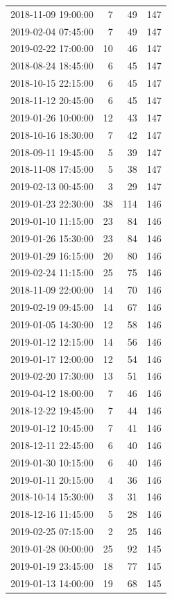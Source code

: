 \begin{tabular}{lrrr}
2018-11-09 19:00:00 & 7 & 49 & 147 \\
2019-02-04 07:45:00 & 7 & 49 & 147 \\
2019-02-22 17:00:00 & 10 & 46 & 147 \\
2018-08-24 18:45:00 & 6 & 45 & 147 \\
2018-10-15 22:15:00 & 6 & 45 & 147 \\
2018-11-12 20:45:00 & 6 & 45 & 147 \\
2019-01-26 10:00:00 & 12 & 43 & 147 \\
2018-10-16 18:30:00 & 7 & 42 & 147 \\
2018-09-11 19:45:00 & 5 & 39 & 147 \\
2018-11-08 17:45:00 & 5 & 38 & 147 \\
2019-02-13 00:45:00 & 3 & 29 & 147 \\
2019-01-23 22:30:00 & 38 & 114 & 146 \\
2019-01-10 11:15:00 & 23 & 84 & 146 \\
2019-01-26 15:30:00 & 23 & 84 & 146 \\
2019-01-29 16:15:00 & 20 & 80 & 146 \\
2019-02-24 11:15:00 & 25 & 75 & 146 \\
2018-11-09 22:00:00 & 14 & 70 & 146 \\
2019-02-19 09:45:00 & 14 & 67 & 146 \\
2019-01-05 14:30:00 & 12 & 58 & 146 \\
2019-01-12 12:15:00 & 14 & 56 & 146 \\
2019-01-17 12:00:00 & 12 & 54 & 146 \\
2019-02-20 17:30:00 & 13 & 51 & 146 \\
2019-04-12 18:00:00 & 7 & 46 & 146 \\
2018-12-22 19:45:00 & 7 & 44 & 146 \\
2019-01-12 10:45:00 & 7 & 41 & 146 \\
2018-12-11 22:45:00 & 6 & 40 & 146 \\
2019-01-30 10:15:00 & 6 & 40 & 146 \\
2019-01-11 20:15:00 & 4 & 36 & 146 \\
2018-10-14 15:30:00 & 3 & 31 & 146 \\
2018-12-16 11:45:00 & 5 & 28 & 146 \\
2019-02-25 07:15:00 & 2 & 25 & 146 \\
2019-01-28 00:00:00 & 25 & 92 & 145 \\
2019-01-19 23:45:00 & 18 & 77 & 145 \\
2019-01-13 14:00:00 & 19 & 68 & 145 \\

\end{tabular}

